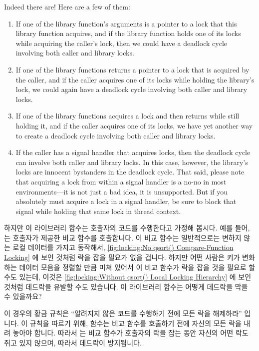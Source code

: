 {	Indeed there are!
	Here are a few of them:
	\begin{enumerate}
	\item	If one of the library function's arguments is a pointer
		to a lock that this library function acquires, and if
		the library function holds one of its locks while
		acquiring the caller's lock, then we could have a
		deadlock cycle involving both caller and library locks.
	\item	If one of the library functions returns a pointer to
		a lock that is acquired by the caller, and if the
		caller acquires one of its locks while holding the
		library's lock, we could again have a deadlock
		cycle involving both caller and library locks.
	\item	If one of the library functions acquires a lock and
		then returns while still holding it, and if the caller
		acquires one of its locks, we have yet another way
		to create a deadlock cycle involving both caller
		and library locks.
	\item	If the caller has a signal handler that acquires
		locks, then the deadlock cycle can involve both
		caller and library locks.
		In this case, however, the library's locks are
		innocent bystanders in the deadlock cycle.
		That said, please note that acquiring a lock from
		within a signal handler is a no-no in most
		environments---it is not just a bad idea, it
		is unsupported.
		But if you absolutely must acquire a lock in a signal
		handler, be sure to block that signal while holding that
		same lock in thread context.
	\end{enumerate}

	\fi

}\QuickQuizEnd

하지만 이 라이브러리 함수는 호출자의 코드를 수행한다고 가정해 봅시다.
예를 들어,  는 호출자가 제공한 비교 함수를 호출합니다.
이 비교 함수는 일반적으로는 변하지 않는 로컬 데이터를 가지고 동작해서,
\cref{fig:locking:No qsort() Compare-Function Locking} 에 보인 것처럼 락을 잡을
필요가 없을 겁니다.
하지만 어떤 사람은 키가 변화하는 데이터 모음을 정렬할 만큼 미쳐 있어서 이 비교
함수가 락을 잡을 것을 필요로 할 수도 있는데, 이것은
\cref{fig:locking:Without qsort() Local Locking Hierarchy} 에 보인 것처럼
데드락을 유발할 수도 있습니다.
이 라이브러리 함수는 어떻게 데드락을 막을 수 있을까요?

이 경우의 황금 규칙은 ``알려지지 않은 코드를 수행하기 전에 모든 락을 해제하라''
입니다.
이 규칙을 따르기 위해,  함수는 비교 함수를 호출하기 전에 자신의
모든 락을 내려 놓아야 합니다.
따라서  는 비교 함수가 호출자의 락을 잡는 동안 자신의 어떤 락도
쥐고 있지 않으며, 따라서 데드락이 방지됩니다.

